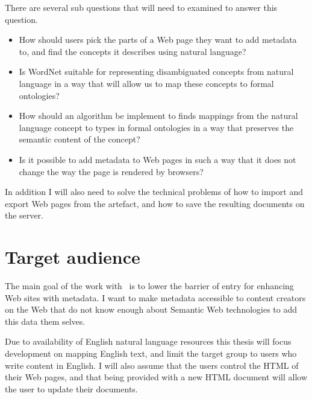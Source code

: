 There are several sub questions that will need to examined to answer this question.
\begin{itemize}
	\item How should users pick the parts of a Web page they want to add metadata to, and find the concepts it describes using natural language?
	\item Is WordNet suitable for representing disambiguated concepts from natural language in a way that will allow us to map these concepts to formal ontologies?
	\item How should an algorithm be implement to finds mappings from the natural language concept to types in
			formal ontologies in a way that preserves the semantic content of the concept?
	\item Is it possible to add metadata to Web pages in such a way that it does not change the way the page is rendered by browsers?
\end{itemize}

In addition I will also need to solve the technical problems of how to import and export Web pages from the artefact,
and how to save the resulting documents on the server.

\section{Target audience}
The main goal of the work with \theartefact\ is to lower the barrier of entry for enhancing Web sites with metadata.
I want to make metadata accessible to content creators on the Web that do not know enough about Semantic Web technologies
to add this data them selves.

Due to availability of English natural language resources this thesis will focus development on mapping English text,
and limit the target group to users who write content in English.
I will also assume that the users control the HTML of their Web pages,
and that being provided with a new HTML document will allow the user to update their documents.

